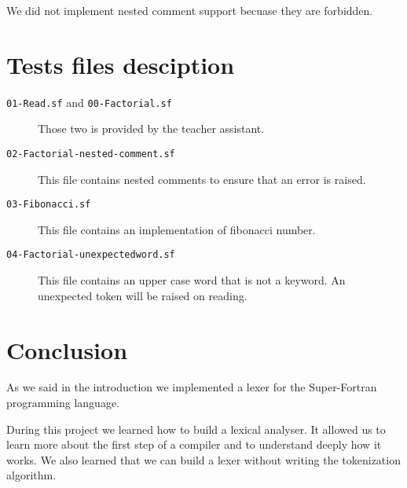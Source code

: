 \documentclass[12pt]{article}
\begin{document}
We did not implement nested comment support becuase they are forbidden.

\section{Tests files desciption}

\begin{description}
    \item[\texttt{01-Read.sf} and \texttt{00-Factorial.sf}] Those two is provided by the teacher assistant.   
    \item[\texttt{02-Factorial-nested-comment.sf}] This file contains nested comments to ensure that an error is raised.
    \item[\texttt{03-Fibonacci.sf}] This file contains an implementation of fibonacci number.
    \item[\texttt{04-Factorial-unexpectedword.sf}] This file contains an upper case word that is not a keyword. An unexpected token will be raised on reading.
\end{description}


\section{Conclusion}

As we said in the introduction we implemented a lexer for the Super-Fortran programming language.

During this project we learned how to build a lexical analyser.
It allowed us to learn more about the first step of a compiler and to understand deeply how it works.
We also learned that we can build a lexer without writing the tokenization algorithm.
\end{document}
